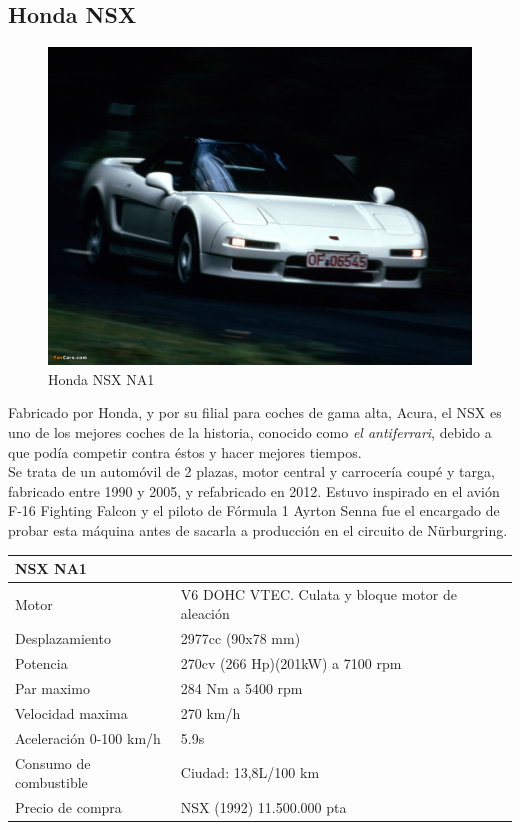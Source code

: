 \documentclass[10pt,a4paper]{report}
\begin{document}
\subsection{Honda NSX}
\begin{figure}
    \includegraphics[scale=0.90]{na1.jpg}
  \caption{Honda NSX NA1}
\end{figure}
Fabricado por Honda, y por su filial para coches de gama alta, Acura, el NSX es uno de los mejores coches de la historia, conocido como \textit{el antiferrari}, debido a que podía competir contra éstos y hacer mejores tiempos.\\
Se trata de un automóvil de 2 plazas, motor central y carrocería coupé y targa, fabricado entre 1990 y 2005, y refabricado en 2012.
Estuvo inspirado en el avión  F-16 Fighting Falcon y el piloto de Fórmula 1 Ayrton Senna fue el encargado de probar esta máquina antes de sacarla a producción en el circuito de Nürburgring.
\\

\begin{table}[htbp]
\begin{center}
\begin{tabular}{|l|l|}
\hline
\textbf{NSX NA1} \\
\hline \hline
Motor & V6 DOHC VTEC. Culata y bloque motor de aleación \\ \hline
Desplazamiento & 2977cc (90x78 mm) \\ \hline
Potencia & 270cv (266 Hp)(201kW) a 7100 rpm \\ \hline
Par maximo & 284 Nm a 5400 rpm \\ \hline
Velocidad maxima & 270 km/h \\ \hline
Aceleración 0-100 km/h & 5.9s \\ \hline
Consumo de combustible & Ciudad: 13,8L/100 km \\ \hline
Precio de compra & NSX (1992) 11.500.000 pta \\ \hline
\end{tabular}
\label{tabla:sencilla}
\end{center}
\end{table}
\end{document}

